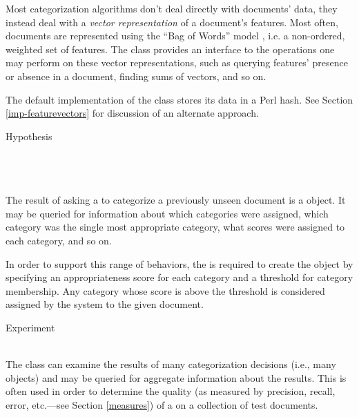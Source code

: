 \begin{description}
Most categorization algorithms don't deal directly with documents'
data, they instead deal with a \emph{vector representation} of a
document's features.  Most often, documents are represented using the
``Bag of Words'' model \cite[p. 10]{sebastiani:02}, i.e. a non-ordered, weighted set of
features.  The  class provides an interface to the
operations one may perform on these vector representations, such as
querying features' presence or absence in a document, finding sums of
vectors, and so on.

The default implementation of the  class stores
its data in a Perl hash.  See Section \ref{imp-featurevectors} for
discussion of an alternate approach.

\item
\begin{concreteclass}{Hypothesis}
 \attributes
   \\
   \\
 \methods
   \\
   \\
\end{concreteclass}

The result of asking a  to categorize a previously unseen
document is a  object.  It may be queried for information
about which categories were assigned, which category was the single
most appropriate category, what scores were assigned to each category,
and so on.

In order to support this range of behaviors, the  is
required to create the  object by specifying an
appropriateness score for each category and a threshold for category
membership.  Any category whose score is above the threshold is
considered assigned by the system to the given document.

\item
\begin{concreteclass}{Experiment}
 \attributes
 \methods
   \\
   \\
\end{concreteclass}

The  class can examine the results of many categorization
decisions (i.e., many  objects) and may be queried for
aggregate information about the results.  This is often used in order
to determine the quality (as measured by precision, recall, error,
etc.---see Section \ref{measures}) of a  on a
collection of test documents.


\end{description}
